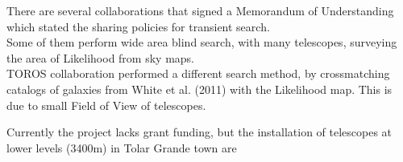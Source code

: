 \documentclass[10pt]{beamer}
\begin{document}
\begin{frame}
There are several collaborations that signed a Memorandum of Understanding
which stated the sharing policies for transient search.\\
\pause
Some of them perform wide area blind search, with many telescopes, surveying the 
area of Likelihood from sky maps.\\
\pause
TOROS collaboration performed a different search method, by crossmatching 
catalogs of galaxies from White et al. (2011) with the Likelihood map. 
This is due to small Field of View of telescopes.\\
\end{frame}
\begin{frame}
 
\end{frame}
\begin{frame}
Currently the project lacks grant funding, but the installation 
of telescopes at lower levels (3400m) in Tolar Grande town are 
\end{frame}
\end{document}
